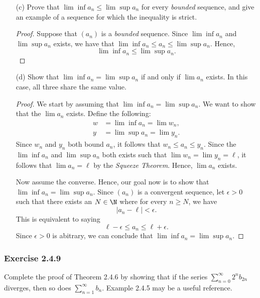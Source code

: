 \begin{enumerate}
\begin{proof}[Solution]
       \end{proof} 
    \item[(c)] Prove that \( \lim \inf a_n \leq \lim \sup a_n  \) for every \textit{bounded} sequence, and give an example of a sequence for which the inequality is strict.
        \begin{proof}
        Suppose that \( (a_n)\) is a \textit{bounded} sequence. Since \( \lim \inf a_n \) and \( \lim \sup a_n \) exists, we have that \( \lim \inf a_n \leq a_n \leq \lim \sup a_n  \). Hence, 
        \[ \lim \inf a_n \leq \lim \sup a_n.  \]
        \end{proof}
    \item[(d)] Show that \( \lim \inf a_n = \lim \sup a_n\) if and only if \( \lim a_n \) exists. In this case, all three share the same value.
        \begin{proof}
        We start by assuming that \( \lim \inf a_n = \lim \sup a_n \). We want to show that the \( \lim a_n  \) exists. Define the following:
        \begin{align*}
        w &= \lim \inf a_n = \lim w_n ,  \\ 
        y &= \lim \sup a_n = \lim y_n . 
        \end{align*} 
        Since \( w_n \) and \( y_n\) both bound \( a_n \), it follows that \( w_n \leq a_n \leq y_n\).
        Since the \( \lim \inf a_n \) and \( \lim \sup a_n \) both exists such that \( \lim  w_n = \lim y_n = \ell \), it follows that \( \lim a_n = \ell \) by the \textit{Squeeze Theorem}. Hence, \( \lim a_n \) exists.

        Now assume the converse. Hence, our goal now is to show that \( \lim \inf a_n = \lim \sup a_n\). Since \( (a_n)\) is a convergent sequence, let \( \epsilon > 0  \) such that there exists an \( N \in \N\) where for every \( n \geq N \), we have
        \[ |a_n - \ell| < \epsilon. \]  
        This is equivalent to saying 
        \[ \ell - \epsilon \leq a_n \leq \ell + \epsilon. \]
        Since \( \epsilon > 0  \) is abitrary, we can conclude that \( \lim \inf a_n = \lim \sup a_n  \).

        \end{proof}
        
\end{enumerate}


\subsubsection{Exercise 2.4.9} Complete the proof of Theorem 2.4.6 by showing that if the series \( \sum_{n=0}^{ \infty} 2^n b_{2n}  \) diverges, then so does \( \sum_{n=1}^{ \infty} b_n \). Example 2.4.5 may be a useful reference.

